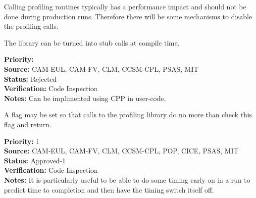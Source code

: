 Calling profiling routines typically has a performance impact and should not
be done during production runs.  Therefore there will be some mechanisms to 
disable the profiling calls.


The library can be turned into stub calls at compile time.

\begin{reqlist}
{\bf Priority:}  \\
{\bf Source:} CAM-EUL, CAM-FV, CLM, CCSM-CPL, PSAS, MIT \\
{\bf Status:} Rejected \\
{\bf Verification:} Code Inspection \\
{\bf Notes:} Can be implimented using CPP in user-code.
\end{reqlist}


A flag may be set so that calls to the profiling library do no more than check
this flag and return.

\begin{reqlist}
{\bf Priority:} 1 \\
{\bf Source:} CAM-EUL, CAM-FV, CLM, CCSM-CPL, POP, CICE, PSAS, MIT \\
{\bf Status:} Approved-1 \\
{\bf Verification:} Code Inspection \\
{\bf Notes:} It is particularly useful to be able to do some timing
early on in a run to predict time to completion and then have
the timing switch itself off.
\end{reqlist}

